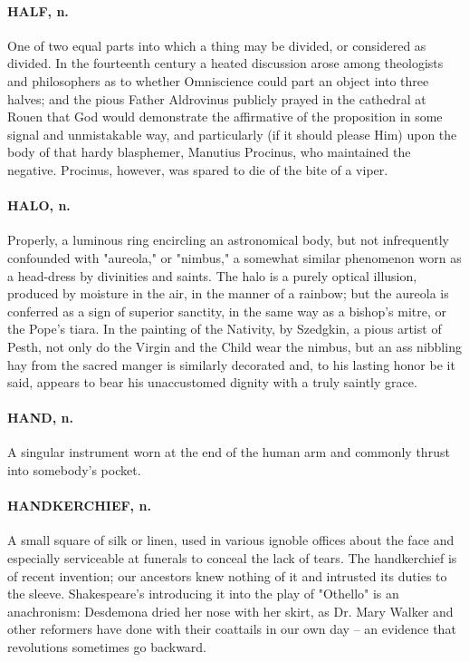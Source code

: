 \documentclass[11pt]{article}
\begin{document}
\paragraph{HALF, n.}  One of two equal parts into which a thing may be divided, or
considered as divided.  In the fourteenth century a heated discussion
arose among theologists and philosophers as to whether Omniscience
could part an object into three halves; and the pious Father
Aldrovinus publicly prayed in the cathedral at Rouen that God would
demonstrate the affirmative of the proposition in some signal and
unmistakable way, and particularly (if it should please Him) upon the
body of that hardy blasphemer, Manutius Procinus, who maintained the
negative.  Procinus, however, was spared to die of the bite of a
viper.

\paragraph{HALO, n.}  Properly, a luminous ring encircling an astronomical body,
but not infrequently confounded with "aureola," or "nimbus," a
somewhat similar phenomenon worn as a head-dress by divinities and
saints.  The halo is a purely optical illusion, produced by moisture
in the air, in the manner of a rainbow; but the aureola is conferred
as a sign of superior sanctity, in the same way as a bishop's mitre,
or the Pope's tiara.  In the painting of the Nativity, by Szedgkin, a
pious artist of Pesth, not only do the Virgin and the Child wear the
nimbus, but an ass nibbling hay from the sacred manger is similarly
decorated and, to his lasting honor be it said, appears to bear his
unaccustomed dignity with a truly saintly grace.

\paragraph{HAND, n.}  A singular instrument worn at the end of the human arm and
commonly thrust into somebody's pocket.

\paragraph{HANDKERCHIEF, n.}  A small square of silk or linen, used in various
ignoble offices about the face and especially serviceable at funerals
to conceal the lack of tears.  The handkerchief is of recent
invention; our ancestors knew nothing of it and intrusted its duties
to the sleeve.  Shakespeare's introducing it into the play of
"Othello" is an anachronism:  Desdemona dried her nose with her skirt,
as Dr. Mary Walker and other reformers have done with their coattails
in our own day -- an evidence that revolutions sometimes go backward.
\end{document}
